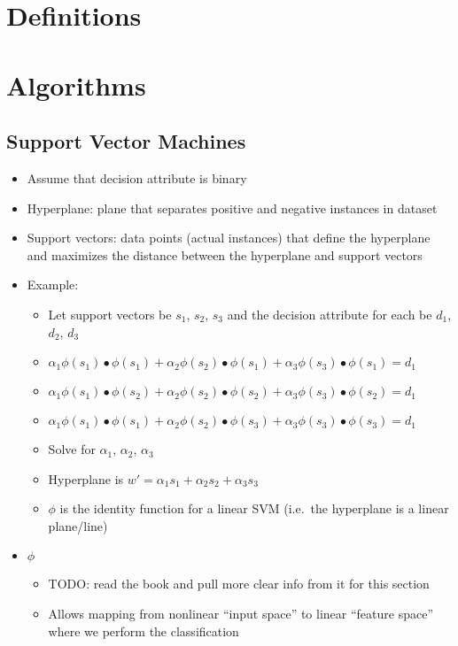 \documentclass{article}
\begin{document}
\section{Definitions}

\section{Algorithms}

\subsection{Support Vector Machines}
\begin{itemize}
	\item Assume that decision attribute is binary
	\item Hyperplane: plane that separates positive and negative instances in dataset
	\item Support vectors: data points (actual instances) that define the hyperplane and maximizes the distance between the hyperplane and support vectors
	\item Example:
		\begin{itemize}
			\item Let support vectors be $s_1$, $s_2$, $s_3$ and the decision attribute for each be $d_1$, $d_2$, $d_3$
			\item $\alpha_1 \phi(s_1) \bullet \phi(s_1) + \alpha_2 \phi(s_2) \bullet \phi(s_1) + \alpha_3 \phi(s_3) \bullet \phi(s_1) = d_1$
			\item $\alpha_1 \phi(s_1) \bullet \phi(s_2) + \alpha_2 \phi(s_2) \bullet \phi(s_2) + \alpha_3 \phi(s_3) \bullet \phi(s_2) = d_1$
			\item $\alpha_1 \phi(s_1) \bullet \phi(s_1) + \alpha_2 \phi(s_2) \bullet \phi(s_3) + \alpha_3 \phi(s_3) \bullet \phi(s_3) = d_1$
			\item Solve for $\alpha_1$, $\alpha_2$, $\alpha_3$
			\item Hyperplane is $w' = \alpha_1 s_1 + \alpha_2 s_2 + \alpha_3 s_3$
			\item $\phi$ is the identity function for a linear SVM (i.e.\ the hyperplane is a linear plane/line)
		\end{itemize}
	\item $\phi$
		\begin {itemize}
		  \item TODO: read the book and pull more clear info from it for this section
			\item Allows mapping from nonlinear ``input space'' to linear ``feature space'' where we perform the classification

\end{itemize}
\end{itemize}
\end{document}
